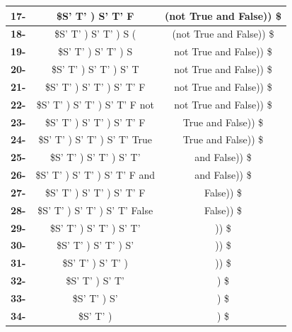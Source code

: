 \documentclass[12pt, letterpaper]{article}
\begin{document}
\begin{enumerate}
\begin{enumerate}[label=(\alph*)]
\begin{enumerate}[label=(\alph*)]
\begin{table}[H]
\begin{tabular}{|c|c|c|}
        \textbf{17-} & \$S' T' ) S' T' F             & (not True and False)) \$                    \\ \hline
        \textbf{18-} & \$S' T' ) S' T' ) S (         & (not True and False)) \$                    \\ \hline
        \textbf{19-} & \$S' T' ) S' T' ) S           & not True and False)) \$                     \\ \hline
        \textbf{20-} & \$S' T' ) S' T' ) S' T        & not True and False)) \$                     \\ \hline
        \textbf{21-} & \$S' T' ) S' T' ) S' T' F     & not True and False)) \$                     \\ \hline
        \textbf{22-} & \$S' T' ) S' T' ) S' T' F not & not True and False)) \$                     \\ \hline
        \textbf{23-} & \$S' T' ) S' T' ) S' T' F     & True and False)) \$                         \\ \hline
        \textbf{24-} & \$S' T' ) S' T' ) S' T' True  & True and False)) \$                         \\ \hline
        \textbf{25-} & \$S' T' ) S' T' ) S' T'       & and False)) \$                              \\ \hline
        \textbf{26-} & \$S' T' ) S' T' ) S' T' F and & and False)) \$                              \\ \hline
        \textbf{27-} & \$S' T' ) S' T' ) S' T' F     & False)) \$                                  \\ \hline
        \textbf{28-} & \$S' T' ) S' T' ) S' T' False & False)) \$                                  \\ \hline
        \textbf{29-} & \$S' T' ) S' T' ) S' T'       & )) \$                                       \\ \hline
        \textbf{30-} & \$S' T' ) S' T' ) S'          & )) \$                                       \\ \hline
        \textbf{31-} & \$S' T' ) S' T' )             & )) \$                                       \\ \hline
        \textbf{32-} & \$S' T' ) S' T'               & ) \$                                        \\ \hline
        \textbf{33-} & \$S' T' ) S'                  & ) \$                                        \\ \hline
        \textbf{34-} & \$S' T' )                     & ) \$                                        \\ \hline

\end{tabular}
\end{table}
\end{enumerate}
\end{enumerate}
\end{enumerate}
\end{document}
